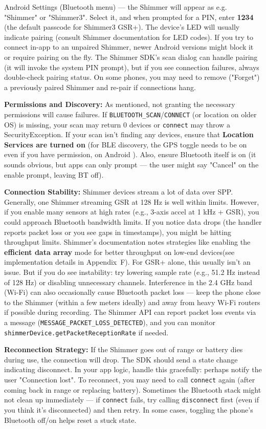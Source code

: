 Android Settings (Bluetooth menu) --- the Shimmer will appear as e.g. "Shimmer" or "Shimmer3". Select it, and when prompted for a PIN, enter \textbf{1234} (the default passcode for Shimmer3 GSR+). The device's LED will usually indicate pairing (consult Shimmer documentation for LED codes). If you try to connect in-app to an unpaired Shimmer, newer Android versions might block it or require pairing on the fly. The Shimmer SDK's scan dialog can handle pairing (it will invoke the system PIN prompt), but if you see connection failures, always double-check pairing status. On some phones, you may need to remove ("Forget") a previously paired Shimmer and re-pair if connections hang. \item \textbf{Permissions and Discovery:} As mentioned, not granting the necessary permissions will cause failures. If \texttt{BLUETOOTH_SCAN}/\texttt{CONNECT} (or location on older OS) is missing, your scan may return 0 devices or \texttt{connect} may throw a SecurityException. If your scan isn't finding any devices, ensure that \textbf{Location Services are turned on} (for BLE discovery, the GPS toggle needs to be on even if you have permission, on Android ). Also, ensure Bluetooth itself is on (it sounds obvious, but apps can only prompt --- the user might say "Cancel" on the enable prompt, leaving BT off). \item \textbf{Connection Stability:} Shimmer devices stream a lot of data over SPP. Generally, one Shimmer streaming GSR at 128 Hz is well within limits. However, if you enable many sensors at high rates (e.g., 3-axis accel at 1 kHz + GSR), you could approach Bluetooth bandwidth limits. If you notice data drops (the handler reports packet loss or you see gaps in timestamps), you might be hitting throughput limits. Shimmer's documentation notes strategies like enabling the \textbf{efficient data array} mode for better throughput on low-end devices(see implementation details in Appendix~F). For GSR+ alone, this usually isn't an issue. But if you do see instability: try lowering sample rate (e.g., 51.2 Hz instead of 128 Hz) or disabling unnecessary channels. Interference in the 2.4 GHz band (Wi-Fi) can also occasionally cause Bluetooth packet loss --- keep the phone close to the Shimmer (within a few meters ideally) and away from heavy Wi-Fi routers if possible during recording. The Shimmer API can report packet loss events via a message (\texttt{MESSAGE_PACKET_LOSS_DETECTED}), and you can monitor \texttt{shimmerDevice.getPacketReceptionRate} if needed. \item \textbf{Reconnection Strategy:} If the Shimmer goes out of range or battery dies during use, the connection will drop. The SDK should send a state change indicating disconnect. In your app logic, handle this gracefully: perhaps notify the user "Connection lost". To reconnect, you may need to call \texttt{connect} again (after coming back in range or replacing battery). Sometimes the Bluetooth stack might not clean up immediately --- if \texttt{connect} fails, try calling \texttt{disconnect} first (even if you think it's disconnected) and then retry. In some cases, toggling the phone's Bluetooth off/on helps reset a stuck state. \item 